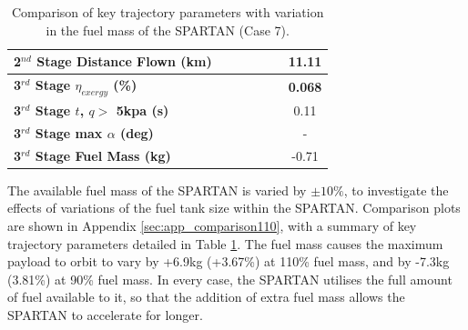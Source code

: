 \begin{table}[!ht]
\begin{tabular}{l c c c c c c}
	\textbf{2$^{nd}$ Stage Distance Flown (km)}
	& \SecondDistmFuelNinetyNoReturn
	& \SecondDistmFuelNinetyFiveNoReturn
	& \SecondDistmFuelStandardNoReturn
	& \SecondDistmFuelOneHundredFiveNoReturn
	& \SecondDistmFuelOneHundredTenNoReturn
	&11.11
	\\
	\hline 
	\textbf{3$^{rd}$ Stage $\eta_{exergy}$ (\%)}
	& \textbf{\thirddExergyEffmFuelNinetyNoReturn}
	& \textbf{\thirddExergyEffmFuelNinetyFiveNoReturn}
	& \textbf{\thirddExergyEffmFuelStandardNoReturn}
	& \textbf{\thirddExergyEffmFuelOneHundredFiveNoReturn}
	& \textbf{\thirddExergyEffmFuelOneHundredTenNoReturn}
	& \textbf{0.068}
	\\

	\textbf{3$^{rd}$ Stage $t$, $q >$ 5kpa (s)}
	& \thirdqOverFivemFuelNinetyNoReturn
	& \thirdqOverFivemFuelNinetyFiveNoReturn
	& \thirdqOverFivemFuelStandardNoReturn
	& \thirdqOverFivemFuelOneHundredFiveNoReturn
	& \thirdqOverFivemFuelOneHundredTenNoReturn
	&0.11
	\\
	\textbf{3$^{rd}$ Stage max $\alpha$ (deg)}
	& \thirdmaxAoAmFuelNinetyNoReturn
	& \thirdmaxAoAmFuelNinetyFiveNoReturn
	& \thirdmaxAoAmFuelStandardNoReturn
	& \thirdmaxAoAmFuelOneHundredFiveNoReturn
	& \thirdmaxAoAmFuelOneHundredTenNoReturn
	& -
	\\
	\textbf{3$^{rd}$ Stage Fuel Mass (kg)}
	& \thirdmFuelmFuelNinetyNoReturn
	& \thirdmFuelmFuelNinetyFiveNoReturn
	& \thirdmFuelmFuelStandardNoReturn
	& \thirdmFuelmFuelOneHundredFiveNoReturn
	& \thirdmFuelmFuelOneHundredTenNoReturn
	&-0.71
	\\
	\hline 
\end{tabular} 

\caption{Comparison of key trajectory parameters with variation in the fuel mass of the SPARTAN (Case 7).}
\label{tab:comparison110}
\end{table}

The available fuel mass of the SPARTAN is varied by $\pm 10\%$, to investigate the effects of variations of the fuel tank size within the SPARTAN. Comparison plots are shown in Appendix \ref{sec:app_comparison110}, with a summary of key trajectory parameters detailed in Table \ref{tab:comparison110}.
The fuel mass causes the maximum payload to orbit to vary by +6.9kg (+3.67\%) at 110\% fuel mass, and by -7.3kg (3.81\%) at 90\% fuel mass. 
 In every case, the SPARTAN utilises the full amount of fuel available to it, so that the addition of extra fuel mass allows the SPARTAN to accelerate for longer. 

